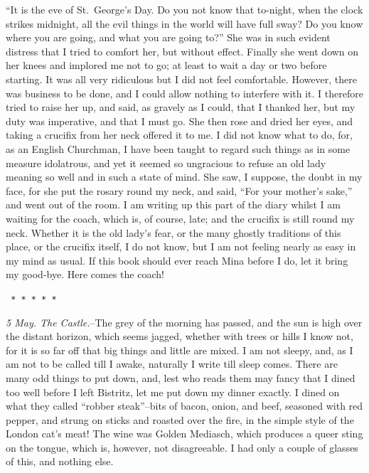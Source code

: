 \documentclass[12pt,openright]{book}
\begin{document}
“It is the eve of St. George’s Day. Do you not know that to-night, when the clock strikes midnight, all the evil things in the world will have full sway? Do you know where you are going, and what you are going to?” She was in such evident distress that I tried to comfort her, but without effect. Finally she went down on her knees and implored me not to go; at least to wait a day or two before starting. It was all very ridiculous but I did not feel comfortable. However, there was business to be done, and I could allow nothing to interfere with it. I therefore tried to raise her up, and said, as gravely as I could, that I thanked her, but my duty was imperative, and that I must go. She then rose and dried her eyes, and taking a crucifix from her neck offered it to me. I did not know what to do, for, as an English Churchman, I have been taught to regard such things as in some measure idolatrous, and yet it seemed so ungracious to refuse an old lady meaning so well and in such a state of mind. She saw, I suppose, the doubt in my face, for she put the rosary round my neck, and said, “For your mother’s sake,” and went out of the room. I am writing up this part of the diary whilst I am waiting for the coach, which is, of course, late; and the crucifix is still round my neck. Whether it is the old lady’s fear, or the many ghostly traditions of this place, or the crucifix itself, I do not know, but I am not feeling nearly as easy in my mind as usual. If this book should ever reach Mina before I do, let it bring my good-bye. Here comes the coach!

\texttt{   *       *       *       *       *}

\textit{5 May. The Castle.}–The grey of the morning has passed, and the sun is high over the distant horizon, which seems jagged, whether with trees or hills I know not, for it is so far off that big things and little are mixed. I am not sleepy, and, as I am not to be called till I awake, naturally I write till sleep comes. There are many odd things to put down, and, lest who reads them may fancy that I dined too well before I left Bistritz, let me put down my dinner exactly. I dined on what they called “robber steak”–bits of bacon, onion, and beef, seasoned with red pepper, and strung on sticks and roasted over the fire, in the simple style of the London cat’s meat! The wine was Golden Mediasch, which produces a queer sting on the tongue, which is, however, not disagreeable. I had only a couple of glasses of this, and nothing else.
\end{document}
